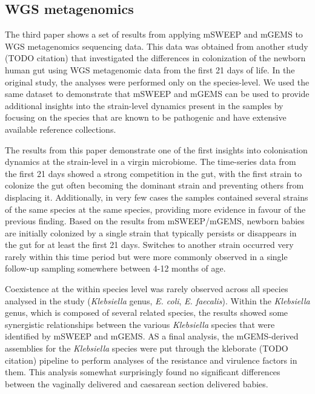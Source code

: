 \documentclass[officiallayout]{tktla}
\begin{document}
\subsection{WGS metagenomics}

The third paper shows a set of results from applying mSWEEP and mGEMS
to WGS metagenomics sequencing data. This data was obtained from
another study (TODO citation) that investigated the differences in
colonization of the newborn human gut using WGS metagenomic data from
the first 21 days of life. In the original study, the analyses were
performed only on the species-level. We used the same dataset to
demonstrate that mSWEEP and mGEMS can be used to provide additional
insights into the strain-level dynamics present in the samples by
focusing on the species that are known to be pathogenic and have
extensive available reference collections.

The results from this paper demonstrate one of the first insights into
colonisation dynamics at the strain-level in a virgin microbiome. The
time-series data from the first 21 days showed a strong competition in
the gut, with the first strain to colonize the gut often becoming the
dominant strain and preventing others from displacing
it. Additionally, in very few cases the samples contained several
strains of the same species at the same species, providing more
evidence in favour of the previous finding. Based on the results from
mSWEEP/mGEMS, newborn babies are initially colonized by a single
strain that typically persists or disappears in the gut for at least
the first 21 days. Switches to another strain occurred very rarely
within this time period but were more commonly observed in a single
follow-up sampling somewhere between 4-12 months of age.

Coexistence at the within species level was rarely observed across all
species analysed in the study (\textit{Klebsiella} genus,
\textit{E. coli}, \textit{E. faecalis}). Within the
\textit{Klebsiella} genus, which is composed of several related
species, the results showed some synergistic relationships between the
various \textit{Klebsiella} species that were identified by mSWEEP and
mGEMS. AS a final analysis, the mGEMS-derived assemblies for the
\textit{Klebsiella} species were put through the kleborate (TODO
citation) pipeline to perform analyses of the resistance and virulence
factors in them. This analysis somewhat surprisingly found no
significant differences between the vaginally delivered and caesarean
section delivered babies.
\end{document}
